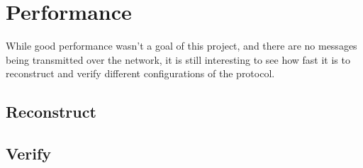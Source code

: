 \documentclass[a4paper,oneside,12pt,final]{article}
\begin{document}
\section{Performance}

While good performance wasn't a goal of this project, and there are no messages
being transmitted over the network, it is still interesting to see how fast it
is to reconstruct and verify different configurations of the protocol.

\subsection{Reconstruct}


\subsection{Verify}

\end{document}
